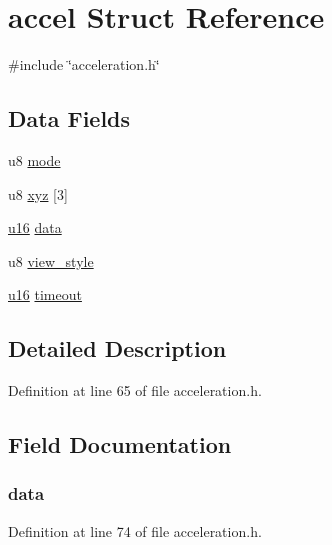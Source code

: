 \hypertarget{structaccel}{\section{accel \-Struct \-Reference}
\label{structaccel}
}


{\ttfamily \#include \char`\"{}acceleration.\-h\char`\"{}}

\subsection*{\-Data \-Fields}
\begin{DoxyCompactItemize}
\item 
u8 \hyperlink{structaccel_a7cea6ae40aa46b41e3806213a39718c6}{mode}
\item 
u8 \hyperlink{structaccel_af9cba48daaf1e24eb2df884547c0efcc}{xyz} \mbox{[}3\mbox{]}
\item 
\hyperlink{main__ED__BM_8c_a9e6c91d77e24643b888dbd1a1a590054}{u16} \hyperlink{structaccel_a14960b1d2a168a4fb46d1acf9b3795e4}{data}
\item 
u8 \hyperlink{structaccel_a12daf57ef9d0a0b0e764ac25f7f4f536}{view\-\_\-style}
\item 
\hyperlink{main__ED__BM_8c_a9e6c91d77e24643b888dbd1a1a590054}{u16} \hyperlink{structaccel_a735bf6536b07682f96c9417b0f1e9079}{timeout}
\end{DoxyCompactItemize}


\subsection{\-Detailed \-Description}


\-Definition at line 65 of file acceleration.\-h.



\subsection{\-Field \-Documentation}
\hypertarget{structaccel_a14960b1d2a168a4fb46d1acf9b3795e4}{
\subsubsection[{data}]{ {\bf data}}}\label{structaccel_a14960b1d2a168a4fb46d1acf9b3795e4}


\-Definition at line 74 of file acceleration.\-h.

